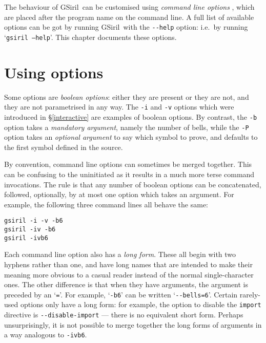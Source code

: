 \documentclass[a4paper,11pt,oneside]{book}
\makeatletter
\newcommand{\loid}[1]{\index{#1@{\hspace*{-\loptwidth}\texttt{--#1}}|ulink}}
\newcommand{\symidx}[2]{} %
\def\gsiril{GSiril}
\newcommand{\sref}[1]{\hyperref[#1]{\S\ref{#1}}}
\makeatother
\begin{document}
The behaviour of \gsiril\ can be customised using \textit{command line
options}%
\symidx{-}{options}, which are placed after the program
name on the command line.  A full list of available options can be got
by running \gsiril\ with the \verb+--help+ option:\loid{help} i.e.\ by
running `\texttt{gsiril --help}'.  This chapter documents these options.

\section{Using options}

Some options are \textit{boolean options}: either they are present or they are
not, and they are not parametrised in any way.  The \verb+-i+ and \verb+-v+
options which were introduced in \sref{interactive} are examples of boolean
options.  By contrast, the \verb+-b+ option takes a \textit{mandatory
argument}, namely the number of bells, while the \verb+-P+ option takes an
\textit{optional argument} to say which symbol to prove, and defaults to the
first symbol defined in the source.

By convention, command line options can sometimes be merged together.
This can be confusing to the uninitiated as it results in a much more terse
command invocations.  The rule is that any number of boolean options can be
concatenated, followed, optionally, by at most one option which takes an
argument.  For example, the following three command lines all behave the same:

\begin{Verbatim}
gsiril -i -v -b6
gsiril -iv -b6
gsiril -ivb6
\end{Verbatim}

Each command line option also has a \textit{long form}.  These all begin
with two hyphens rather than one, and have long names that are intended to 
make their meaning more obvious to a casual reader instead of the 
normal single-character ones.  The other difference is that when they
have arguments, the argument is preceded by an `\verb+=+'.  For example,
`\verb+-b6+' can be written `\verb+--bells=6+'.  
Certain rarely-used options only have a long form: for example,
the option to disable the \texttt{import} directive is 
\verb+--disable-import+ --- there is no equivalent short form.
Perhaps unsurprisingly, it is not possible to merge together the long forms 
of arguments in a way analogous to \verb+-ivb6+.
\end{document}
